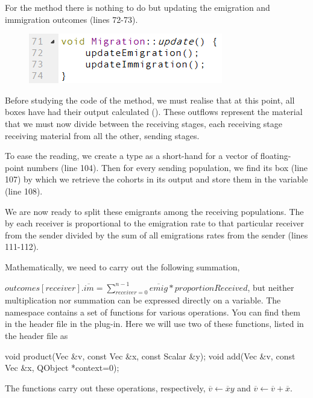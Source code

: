 For the  method there is nothing to do but updating the emigration and immigration outcomes (lines 72-73).

\begin{figure} [ht]
\includegraphics[scale=0.7,left]{graphics/migration-cpp-update}
\end{figure}

Before studying the code of the  method, we must realise that at this point, all  boxes have had their  output calculated (). These outflows represent the material that we must now divide between the receiving stages, each receiving stage receiving material from all the other, sending stages.

To ease the reading, we create a type  as a short-hand for a vector of floating-point numbers (line 104). Then for every sending population, we find its  box (line 107) by which we retrieve the cohorts in its  output and store them in the  variable (line 108).

We are now ready to split these emigrants among the receiving populations. The  by each receiver is proportional to the emigration rate to that particular receiver from the sender divided by the sum of all emigrations rates from the sender (lines 111-112).

Mathematically, we need to carry out the following summation,

$outcomes[receiver].\overline{im} = \sum\limits_{receiver=0}^{n-1} \overline{emig} * proportionReceived$,
but neither multiplication nor summation can be expressed directly on a  variable. The  namespace contains a set of functions for various  operations. You can find them in the  header file in the  plug-in. Here we will use two of these functions, listed in the header file as
\begin{cpp}
void product(Vec &v, const Vec &x, const Scalar &y);
void add(Vec &v, const Vec &x, QObject *context=0);
\end{cpp}

The functions carry out these operations, respectively, $\overline{v} \leftarrow \overline{x} y$ and $\overline{v} \leftarrow \overline{v} + \overline{x}$.

